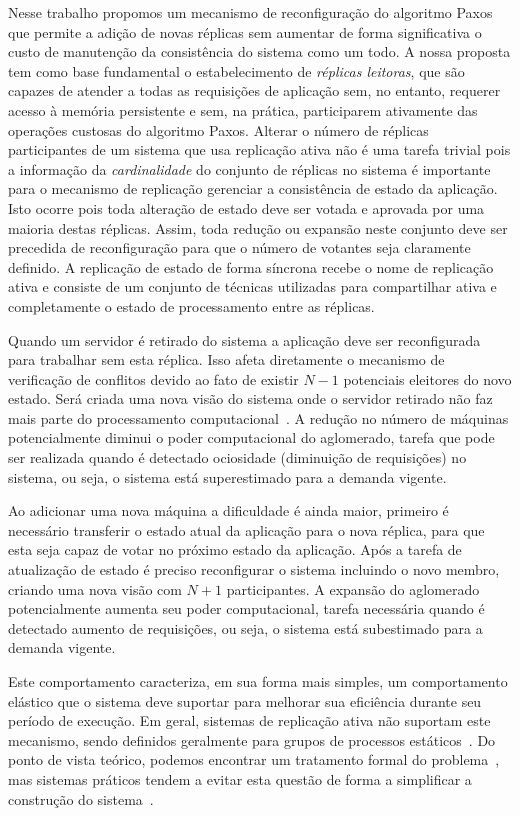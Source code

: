 Nesse trabalho propomos um mecanismo de reconfiguração do algoritmo Paxos que permite a
adição de novas réplicas sem aumentar de forma significativa o custo de manutenção da
consistência do sistema como um todo. A nossa proposta tem como base fundamental o
estabelecimento de \emph{réplicas leitoras}, que são capazes de atender a todas as
requisições de aplicação sem, no entanto, requerer acesso à memória persistente e sem,
na prática, participarem ativamente das operações custosas do algoritmo Paxos. Alterar o
número de réplicas participantes de um sistema que usa replicação ativa não é uma tarefa
trivial pois a informação da \emph{cardinalidade} do conjunto de réplicas no sistema é
importante para o mecanismo de replicação gerenciar a consistência de estado da aplicação.
Isto ocorre pois toda alteração de estado deve ser votada e aprovada por uma maioria
destas réplicas. Assim, toda redução ou expansão neste conjunto deve ser precedida de
reconfiguração para que o número de votantes seja claramente definido.
A replicação de estado de forma síncrona recebe o nome de replicação ativa e consiste de
um conjunto de técnicas utilizadas para compartilhar ativa e completamente o estado de
processamento entre as réplicas.

Quando um servidor é retirado do sistema a aplicação deve ser reconfigurada para
trabalhar sem esta réplica. Isso afeta diretamente o mecanismo de verificação de conflitos
devido ao fato de existir $N-1$ potenciais eleitores do novo estado. Será criada uma nova
visão do sistema onde o servidor retirado não faz mais parte do processamento
computacional~\cite{lamport10}. A redução no número de máquinas potencialmente diminui o
poder computacional do aglomerado, tarefa que pode ser realizada quando é detectado
ociosidade (diminuição de requisições) no sistema, ou seja, o sistema está superestimado
para a demanda vigente.

Ao adicionar uma nova máquina a dificuldade é ainda maior, primeiro é necessário
transferir o estado atual da aplicação para o nova réplica, para que esta seja capaz de
votar no próximo estado da  aplicação. Após a tarefa de atualização de estado é preciso
reconfigurar o sistema incluindo o novo membro, criando uma nova visão com $N+1$
participantes. A expansão do aglomerado potencialmente aumenta seu poder computacional,
tarefa necessária quando é  detectado aumento de requisições, ou seja, o sistema está
subestimado para a demanda vigente.

Este comportamento  caracteriza, em sua forma mais simples, um comportamento elástico que
o sistema deve suportar para melhorar sua eficiência durante seu período de execução. Em
geral, sistemas de replicação ativa não suportam este mecanismo, sendo definidos
geralmente para grupos  de processos estáticos~\cite{chandra96, lamport98}. Do ponto de
vista teórico, podemos encontrar um tratamento formal do problema~\cite{lamport10}, mas
sistemas práticos tendem a evitar esta questão de forma a simplificar a construção do
sistema~\cite{chandra07}.


